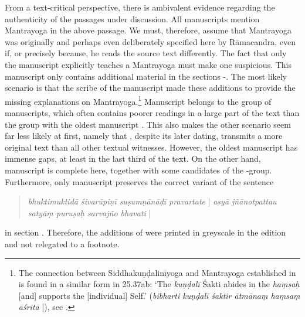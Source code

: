 From a text-critical perspective, there is ambivalent evidence regarding the authenticity of the passages under discussion. All manuscripts mention Mantrayoga in the above passage. We must, therefore, assume that Mantrayoga was originally and perhaps even deliberately specified here by Rāmacandra, even if, or precisely because, he reads the source text differently. The fact that only the manuscript  explicitly teaches a Mantrayoga must make one suspicious. This manuscript only contains additional material in the sections -. The most likely scenario is that the scribe of the manuscript  made these additions to provide the missing explanations on Mantrayoga.\footnote{The connection between Siddhakuṇḍalinīyoga and Mantrayoga established in  is found in a similar form in  25.37ab: `The \textit{kuṇḍalī} Śakti abides in the \textit{haṃsaḥ} [and] supports the [individual] Self.' (\textit{bibharti kuṇḍalī śaktir ātmānaṃ haṃsaṃ āśritā} |), see \citeauthor[2011: pp. 218, 228]{saradatilakafull}.} Manuscript  belongs to the \beta group of manuscripts, which often contains poorer readings in a large part of the text than the \alpha group with the oldest manuscript . This also makes the other scenario seem far less likely at first, namely that , despite its later dating, transmits a more original text than all other textual witnesses. However, the oldest manuscript  has immense gaps, at least in the last third of the text. On the other hand, manuscript  is complete here, together with some candidates of the \beta-group. Furthermore, only manuscript  preserves the correct variant of the sentence \begin{quote} \textit{bhuktimuktidā śivarūpiṇī suṣumṇānāḍī pravartate} | \textit{asyā jñānotpattau satyāṃ puruṣaḥ sarvajño bhavati} | \end{quote} in section . Therefore, the additions of  were printed in greyscale in the edition and not relegated to a footnote.

